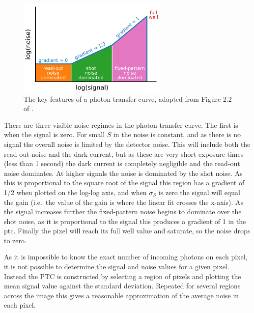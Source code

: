 \begin{colsection}
\begin{colsection}
\newpage

\begin{figure}[t]
    \begin{center}
        \includegraphics[width=0.65\textwidth]{images/ptc.pdf}
    \end{center}
    \caption[Key features of the photon transfer curve]{
        The key features of a photon transfer curve, adapted from Figure 2.2 of \citet{CCDs}.
        }\label{fig:ptc_cartoon}
\end{figure}

There are three visible noise regimes in the photon transfer curve. The first is when the signal is zero. For small $S$ in  the noise is constant, and as there is no signal the overall noise is limited by the detector noise. This will include both the read-out noise and the dark current, but as these are very short exposure times (less than 1 second) the dark current is completely negligible and the read-out noise dominates. At higher signals the noise is dominated by the shot noise. As this is proportional to the square root of the signal this region has a gradient of 1/2 when plotted on the log-log axis, and when $\sigma_S$ is zero the signal will equal the gain (i.e.\ the value of the gain is where the linear fit crosses the x-axis). As the signal increases further the fixed-pattern noise begins to dominate over the shot noise, as it is proportional to the signal this produces a gradient of 1 in the \gls{ptc}. Finally the pixel will reach its full well value and saturate, so the noise drops to zero.

As it is impossible to know the exact number of incoming photons on each pixel, it is not possible to determine the signal and noise values for a given pixel. Instead the PTC is constructed by selecting a region of pixels and plotting the mean signal value against the standard deviation. Repeated for several regions across the image this gives a reasonable approximation of the average noise in each pixel.


\end{colsection}
\end{colsection}
